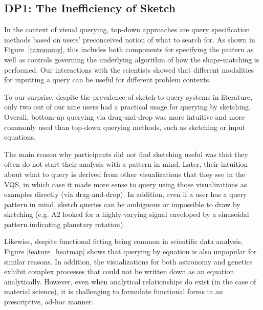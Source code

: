 \subsection{DP1: The Inefficiency of Sketch}
\par In the context of visual querying, top-down approaches are query specification methods based on users' preconceived notion of what to search for. As shown in Figure~\ref{taxonomy}, this includes both components for specifying the pattern as well as controls governing the underlying algorithm of how the shape-matching is performed. Our interactions with the scientists showed that different modalities for inputting a query can be useful for different problem contexts.
\par To our surprise, despite the prevalence of sketch-to-query systems in literature, only two out of our nine users had a practical usage for querying by sketching. Overall, bottom-up querying via drag-and-drop was more intuitive and more commonly used than top-down querying methods, such as sketching or input equations.
\par The main reason why participants did not find sketching useful was that they often do not start their analysis with a pattern in mind. Later, their intuition about what to query is derived from other visualizations that they see in the VQS, in which case it made more sense to query using those visualizations as examples directly (via drag-and-drop). In addition, even if a user has a query pattern in mind, sketch queries can be ambiguous or impossible to draw by sketching (e.g. A2 looked for a highly-varying signal enveloped by a sinusoidal pattern indicating planetary rotation).
\par Likewise, despite functional fitting being common in scientific data analysis, Figure \ref{feature_heatmap} shows that querying by equation is also unpopular for similar reasons. In addition, the visualizations for both astronomy and genetics exhibit complex processes that could not be written down as an equation analytically. However, even when analytical relationships do exist (in the case of material science), it is challenging to formulate functional forms in an prescriptive, ad-hoc manner. 
